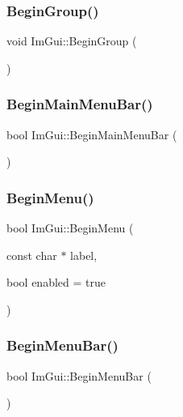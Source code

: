 \mbox{\label{namespace_im_gui_a42407e196b7ed2a8755bff28aae9805f}} 
\subsubsection{\texorpdfstring{Begin\+Group()}{BeginGroup()}}
{\footnotesize\ttfamily void Im\+Gui\+::\+Begin\+Group (\begin{DoxyParamCaption}{ }\end{DoxyParamCaption})}

\mbox{\label{namespace_im_gui_a55cb9cfb9865204ac6fb21c965784f78}} 
\subsubsection{\texorpdfstring{Begin\+Main\+Menu\+Bar()}{BeginMainMenuBar()}}
{\footnotesize\ttfamily bool Im\+Gui\+::\+Begin\+Main\+Menu\+Bar (\begin{DoxyParamCaption}{ }\end{DoxyParamCaption})}

\mbox{\label{namespace_im_gui_a1e55711a21f97d5dff919d697d3a7201}} 
\subsubsection{\texorpdfstring{Begin\+Menu()}{BeginMenu()}}
{\footnotesize\ttfamily bool Im\+Gui\+::\+Begin\+Menu (\begin{DoxyParamCaption}\item[{const char $\ast$}]{label,  }\item[{bool}]{enabled = {\ttfamily true} }\end{DoxyParamCaption})}

\mbox{\label{namespace_im_gui_a4852dff802922163fc747e2e0df5b88f}} 
\subsubsection{\texorpdfstring{Begin\+Menu\+Bar()}{BeginMenuBar()}}
{\footnotesize\ttfamily bool Im\+Gui\+::\+Begin\+Menu\+Bar (\begin{DoxyParamCaption}{ }\end{DoxyParamCaption})}

